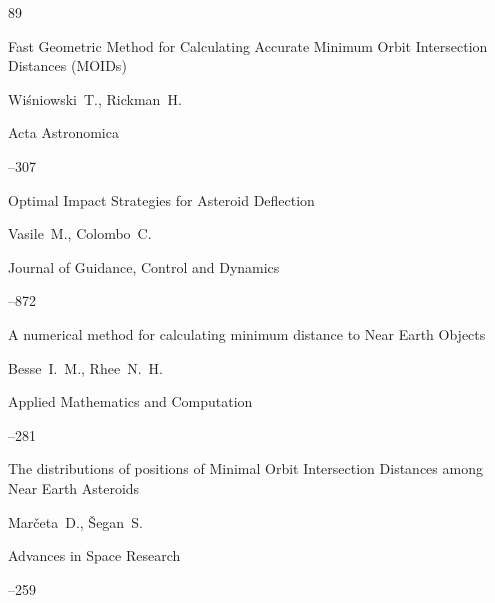 \begin{thebibliography}{89}


\paper Fast Geometric Method for Calculating Accurate Minimum Orbit Intersection Distances (MOIDs)

\by Wi\'sniowski~T., Rickman~H. 

\jour Acta Astronomica 




--307 





\paper Optimal Impact Strategies for Asteroid Deflection

\by Vasile~M., Colombo~C. 

\jour Journal of Guidance, Control and Dynamics




--872






\paper A numerical method for calculating minimum distance to Near Earth Objects

\by Besse~I.~M., Rhee~N.~H.

\jour Applied Mathematics and Computation



–281






\paper The distributions of positions of Minimal Orbit Intersection Distances among Near Earth Asteroids 

\by Mar\v{c}eta~D., \v{S}egan~S. 

\jour Advances in Space Research 




–259


\end{thebibliography}
